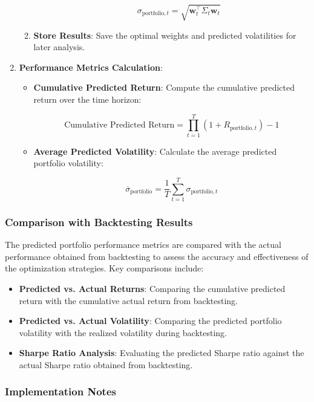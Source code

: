 \begin{enumerate}
\begin{enumerate}
\begin{itemize}
            \[
            \sigma_{\text{portfolio}, t} = \sqrt{\mathbf{w}_t^\top \Sigma_t \mathbf{w}_t}
            \]
        \end{itemize}
        \item \textbf{Store Results}: Save the optimal weights and predicted volatilities for later analysis.
    \end{enumerate}
    \item \textbf{Performance Metrics Calculation}:
    \begin{itemize}
        \item \textbf{Cumulative Predicted Return}: Compute the cumulative predicted return over the time horizon:

        \[
        \text{Cumulative Predicted Return} = \prod_{t=1}^T (1 + R_{\text{portfolio}, t}) - 1
        \]

        \item \textbf{Average Predicted Volatility}: Calculate the average predicted portfolio volatility:

        \[
        \overline{\sigma}_{\text{portfolio}} = \frac{1}{T} \sum_{t=1}^T \sigma_{\text{portfolio}, t}
        \]
    \end{itemize}
\end{enumerate}

\subsubsection{Comparison with Backtesting Results}

The predicted portfolio performance metrics are compared with the actual performance obtained from backtesting to assess the accuracy and effectiveness of the optimization strategies. Key comparisons include:

\begin{itemize}
    \item \textbf{Predicted vs. Actual Returns}: Comparing the cumulative predicted return with the cumulative actual return from backtesting.
    \item \textbf{Predicted vs. Actual Volatility}: Comparing the predicted portfolio volatility with the realized volatility during backtesting.
    \item \textbf{Sharpe Ratio Analysis}: Evaluating the predicted Sharpe ratio against the actual Sharpe ratio obtained from backtesting.
\end{itemize}

\subsubsection{Implementation Notes}


